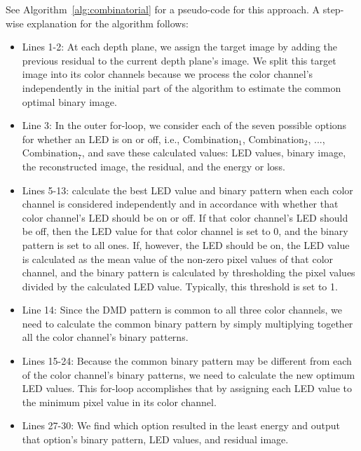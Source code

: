 
%
See Algorithm~\ref{alg:combinatorial} for a pseudo-code for this approach. A step-wise explanation for the algorithm follows:
\begin{itemize}
    \item Lines 1-2: At each depth plane, we assign the target image by adding the previous residual to the current depth plane's image. We split this target image into its color channels because we process the color channel's independently in the initial part of the algorithm to estimate the common optimal binary image.
    \item Line 3: In the outer for-loop, we consider each of the seven possible options for whether an LED is on or off, i.e., $\text{Combination}_1$, $\text{Combination}_2$, ..., $\text{Combination}_7$, and save these calculated values: LED values, binary image, the reconstructed image, the residual, and the energy or loss.
    \item Lines 5-13: calculate the best LED value and binary pattern when each color channel is considered independently and in accordance with whether that color channel's LED should be on or off. If that color channel's LED should be off, then the LED value for that color channel is set to 0, and the binary pattern is set to all ones. If, however, the LED should be on, the LED value is calculated as the mean value of the non-zero pixel values of that color channel, and the binary pattern is calculated by thresholding the pixel values divided by the calculated LED value. Typically, this threshold is set to 1.
    \item Line 14: Since the DMD pattern is common to all three color channels, we need to calculate the common binary pattern by simply multiplying together all the color channel's binary patterns. 
    \item Lines 15-24: Because the common binary pattern may be different from each of the color channel's binary patterns, we need to calculate the new optimum LED values. This for-loop accomplishes that by assigning each LED value to the minimum pixel value in its color channel.
    \item Lines 27-30: We find which option resulted in the least energy and output that option's binary pattern, LED values, and residual image. 
\end{itemize}


